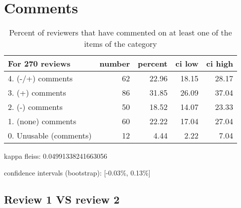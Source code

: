 \documentclass{article}
\begin{document}
\section{Comments} 

\begin{table}[H]

\centering

\begin{tabular}{lrrrr}
\hline
 For 270 reviews        &   number &   percent &   ci low &   ci high \\
\hline
 4. (-/+) comments      &       62 &     22.96 &    18.15 &     28.17 \\
 3. (+) comments        &       86 &     31.85 &    26.09 &     37.04 \\
 2. (-) comments        &       50 &     18.52 &    14.07 &     23.33 \\
 1. (none) comments     &       60 &     22.22 &    17.04 &     27.04 \\
 0. Unusable (comments) &       12 &      4.44 &     2.22 &      7.04 \\
\hline
\end{tabular}\caption{Percent of reviewers that have commented on at least one of the items of the category}

\end{table}



kappa fleiss: 0.04991338241663056

confidence intervals (bootstrap): [-0.03\%, 0.13\%]

\subsection{Review 1 VS review 2} 
\end{document}
